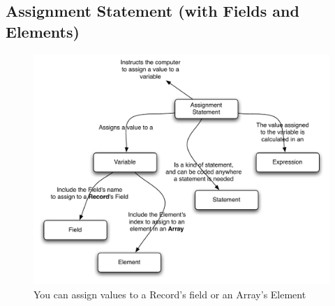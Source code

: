 \clearpage
\subsection{Assignment Statement (with Fields and Elements)} %
\label{sub:assignment_statement_with_fields_and_elements_}

\begin{figure}[h]
   \centering
   \includegraphics[width=\textwidth]{./topics/type-decl/diagrams/Assignment} 
   \caption{You can assign values to a Record's field or an Array's Element}
   \label{fig:type-decl-assignment}
\end{figure}

